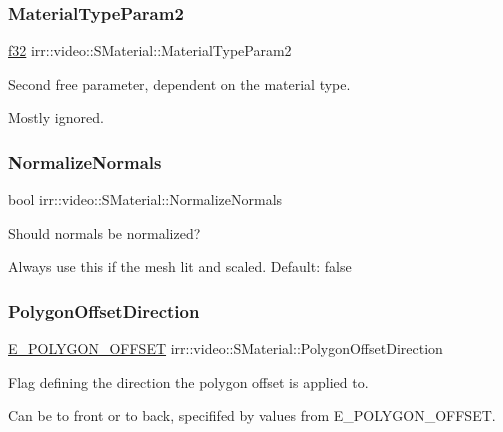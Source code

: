 \subsubsection{\texorpdfstring{Material\+Type\+Param2}{MaterialTypeParam2}}
{\footnotesize\ttfamily \hyperlink{namespaceirr_a0277be98d67dc26ff93b1a6a1d086b07}{f32} irr\+::video\+::\+S\+Material\+::\+Material\+Type\+Param2}



Second free parameter, dependent on the material type. 

Mostly ignored. \mbox{\label{classirr_1_1video_1_1SMaterial_aeee37deac57bebcd42650bc50aeccc2d}} 
\subsubsection{\texorpdfstring{Normalize\+Normals}{NormalizeNormals}}
{\footnotesize\ttfamily bool irr\+::video\+::\+S\+Material\+::\+Normalize\+Normals}



Should normals be normalized? 

Always use this if the mesh lit and scaled. Default\+: false \mbox{\label{classirr_1_1video_1_1SMaterial_ab3da2285d0e74fc99eafdd8944ea4eb8}} 
\subsubsection{\texorpdfstring{Polygon\+Offset\+Direction}{PolygonOffsetDirection}}
{\footnotesize\ttfamily \hyperlink{namespaceirr_1_1video_a812b866b910c946f5bc813f8eab31144}{E\+\_\+\+P\+O\+L\+Y\+G\+O\+N\+\_\+\+O\+F\+F\+S\+ET} irr\+::video\+::\+S\+Material\+::\+Polygon\+Offset\+Direction}



Flag defining the direction the polygon offset is applied to. 

Can be to front or to back, specififed by values from E\+\_\+\+P\+O\+L\+Y\+G\+O\+N\+\_\+\+O\+F\+F\+S\+ET. \mbox{\label{classirr_1_1video_1_1SMaterial_afa24a258ca0ca5eff3b66a3f8aa04462}} 
